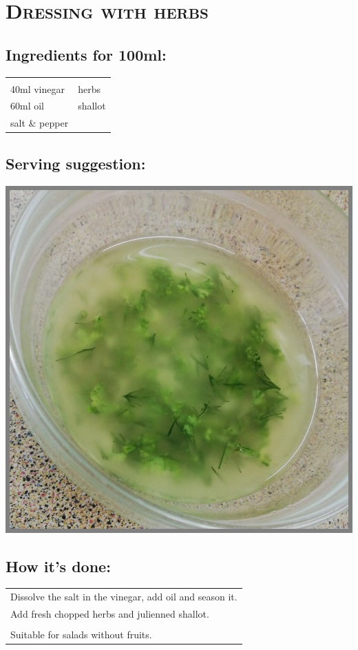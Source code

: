 \section{\textsc{Dressing with herbs}}

\subsection*{Ingredients for 100ml:}

\begin{tabular}{p{7.5cm} p{7.5cm}}
	& \\
	40ml vinegar & herbs \\
	60ml oil & shallot \\
	salt \& pepper &
\end{tabular}

\subsection*{Serving suggestion:}

\includegraphics[width=\textwidth]{img/d_krauter.jpeg} \cite{dkrauter}

\subsection*{How it's done:}

\begin{tabular}{p{15cm}}
	\\
	Dissolve the salt in the vinegar, add oil and season it.\\
	Add fresh chopped herbs and julienned shallot.\\
	\\
	Suitable for salads without fruits.
\end{tabular}
